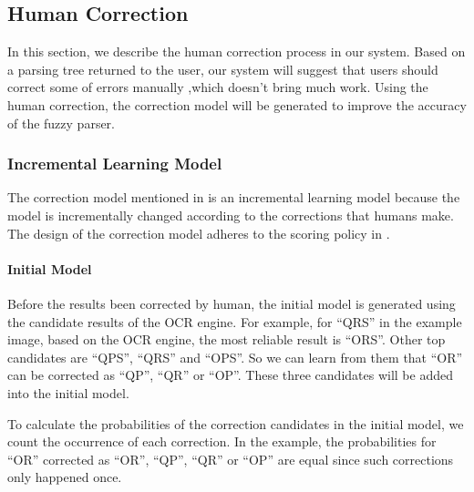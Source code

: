 \subsection{Human Correction}
\label{sec:correction}
In this section, we describe the human correction process in our system.
Based on a parsing tree returned to the user,
our system will suggest that users should correct some of errors manually ,which doesn't bring much work.
Using the human correction, the correction model
will be generated to improve the accuracy of the fuzzy parser.

\subsubsection{Incremental Learning Model}
\label{sec:incremental}
The correction model mentioned in 
is an incremental learning model because
the model is incrementally changed according to the corrections that
humans make. The design of the correction model adheres to the scoring
policy in .

\paragraph{Initial Model}
Before the results been corrected by human,
the initial model is generated using the candidate results of the OCR
engine. For example, for ``QRS'' in the example image, based on the OCR
engine, the most reliable result is ``ORS''. Other top candidates are
``QPS'', ``QRS'' and ``OPS''. So we can learn from them that ``OR'' can be
corrected as ``QP'', ``QR'' or ``OP''. These three candidates
will be added into the initial model.

To calculate the probabilities of the correction candidates in the initial
model, we count the occurrence of each correction. In the example, the
probabilities for ``OR'' corrected as ``OR'', ``QP'', ``QR'' or ``OP'' are equal
since such corrections only happened once.



